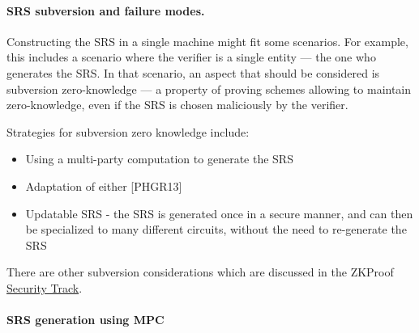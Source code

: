 \paragraph{SRS subversion and failure modes.}
Constructing the SRS in a single machine might fit some scenarios. 
For example, this includes a scenario where the verifier is a single entity --- the one who generates the SRS. 
In that scenario, an aspect that should be considered is subversion zero-knowledge --- a property of proving schemes allowing to maintain zero-knowledge, even if the SRS is chosen maliciously by the verifier.

Strategies for subversion zero knowledge include:
\begin{itemize}[label={- }]
    \item Using a multi-party computation to generate the SRS
    \item Adaptation of either \cite{2016:Eurocrypt:On-the-Size-of-Pairing-Based-Non-interactive-Arguments} %
		[PHGR13]
    \item Updatable SRS - the SRS is generated once in a secure manner, and can then be specialized to many different circuits, without the need to re-generate the SRS
\end{itemize}

There are other subversion considerations which are discussed in the ZKProof \hyperref[chap:track-security]{Security Track}.



\paragraph{SRS generation using MPC}

